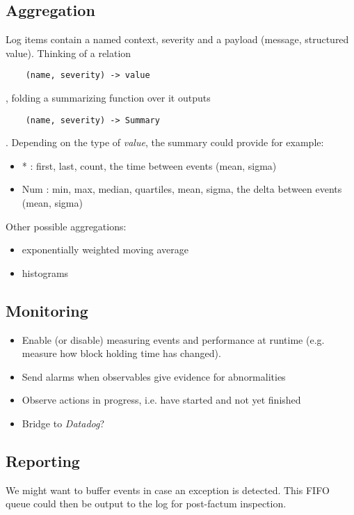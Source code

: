 \subsection{Aggregation}
Log items contain a named context, severity and a payload (message, structured
value). Thinking of a relation \begin{verbatim}
    (name, severity) -> value
\end{verbatim}, folding a summarizing function over it outputs \begin{verbatim}
    (name, severity) -> Summary
\end{verbatim}.
Depending on the type of \emph{value}, the summary could provide for example:

\begin{itemize}
\item * : first, last, count, the time between events (mean, sigma)
\item Num : min, max, median, quartiles, mean, sigma, the delta between events (mean, sigma)
\end{itemize}

Other possible aggregations:
\begin{itemize}
\item exponentially weighted moving average
\item histograms
\end{itemize}

\subsection{Monitoring}
\begin{itemize}
\item Enable (or disable) measuring events and performance at runtime
(e.g. measure how block holding time has changed).
\item Send alarms when observables give evidence for abnormalities
\item Observe actions in progress, i.e. have started and not yet finished
\item Bridge to \emph{Datadog}?
\end{itemize}

\subsection{Reporting}
We might want to buffer events in case an exception is detected. This FIFO queue
could then be output to the log for post-factum inspection. 

